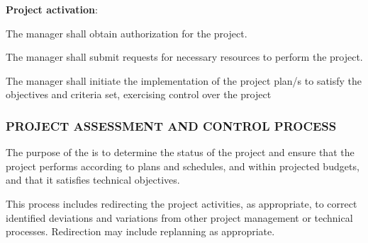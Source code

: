 \begin{adjustwidth}{2em}{0pt}
\begin{compactenum}
\begin{compactenum}
					\end{compactenum}

					\item {\bf Project activation}:
					\begin{compactenum}
						\item The manager shall obtain authorization for the project.

						\item The manager shall submit requests for necessary resources to perform the project.

						\item The manager shall initiate the implementation of the project plan/s to satisfy the objectives and criteria set, exercising control over the project
					\end{compactenum}

				\end{compactenum}

			\end{adjustwidth}

		\newpage
		\subsubsection{PROJECT ASSESSMENT AND CONTROL PROCESS\label{proc:project_assessment_and_control_process}}

			\begin{adjustwidth}{2em}{0pt}

				The purpose of the  is to determine the status of the project and ensure that the project performs according to plans and schedules, and within projected budgets, and that it satisfies technical objectives. 

				This process includes redirecting the project activities, as appropriate, to correct identified deviations and variations from other project management or technical processes. Redirection may include replanning as appropriate.
			
			\end{adjustwidth}

